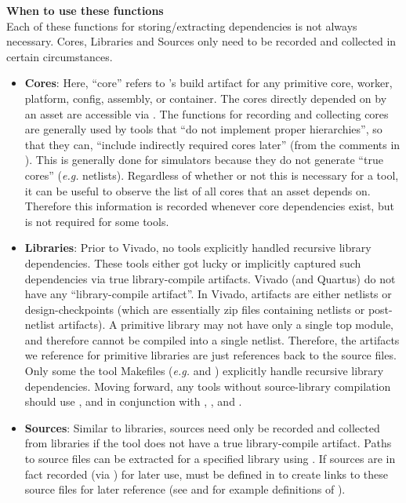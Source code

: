 \textbf{When to use these functions}\\
Each of these functions for storing/extracting dependencies is not always necessary. Cores, Libraries and Sources only need to be recorded and collected in certain circumstances.
\begin{itemize}
\item \textbf{Cores}: Here, ``core'' refers to 's build artifact for any primitive core, worker, platform, config, assembly, or container. The cores directly depended on by an asset are accessible via . The functions for recording and collecting cores are generally used by tools that ``do not implement proper hierarchies'', so that they can, ``include indirectly required cores later'' (from the comments in ). This is generally done for simulators because they do not generate ``true cores'' (\textit{e.g.} netlists). Regardless of whether or not this is necessary for a tool, it can be useful to observe the list of all cores that an asset depends on. Therefore this information is recorded whenever core dependencies exist, but is not required for some tools.

\item \textbf{Libraries}: Prior to Vivado, no tools explicitly handled recursive library dependencies. These tools either got lucky or implicitly captured such dependencies via true library-compile artifacts. Vivado (and Quartus) do not have any ``library-compile artifact''. In Vivado, artifacts are either netlists or design-checkpoints (which are essentially zip files containing netlists or post-netlist artifacts). A primitive library may not have only a single top module, and therefore cannot be compiled into a single netlist. Therefore, the artifacts we reference for primitive libraries are just references back to the source files. Only some the tool Makefiles (\textit{e.g.}  and ) explicitly handle recursive library dependencies. Moving forward, any tools without source-library compilation should use ,  and  in conjunction with , , and .

\item \textbf{Sources}: Similar to libraries, sources need only be recorded and collected from libraries if the tool does not have a true library-compile artifact. Paths to source files can be extracted for a specified library using . If sources are in fact recorded (via ) for later use,  must be defined in  to create links to these source files for later reference (see  and  for example definitions of ).


\end{itemize}
